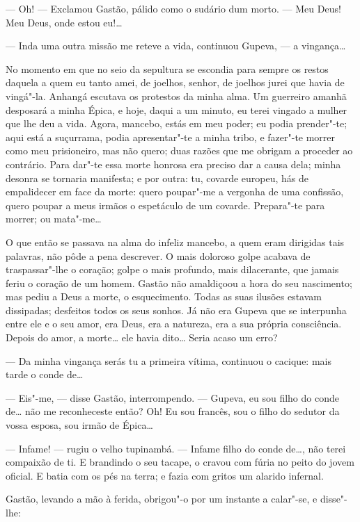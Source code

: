--- Oh! --- Exclamou Gastão, pálido como o sudário dum morto. --- Meu
Deus! Meu Deus, onde estou eu!\ldots{}

--- Inda uma outra missão me reteve a vida, continuou Gupeva, --- a
vingança\ldots{}

No momento em que no seio da sepultura se escondia para sempre os restos
daquela a quem eu tanto amei, de joelhos, senhor, de joelhos jurei que
havia de vingá"-la. Anhangá escutava os protestos da minha alma. Um
guerreiro amanhã desposará a minha Épica, e hoje, daqui a um minuto, eu
terei vingado a mulher que lhe deu a vida. Agora, mancebo, estás em meu
poder; eu podia prender"-te; aqui está a suçurrama, podia apresentar"-te a
minha tribo, e fazer"-te morrer como meu prisioneiro, mas não quero; duas
razões que me obrigam a proceder ao contrário. Para dar"-te essa morte
honrosa era preciso dar a causa dela; minha desonra se tornaria
manifesta; e por outra: tu, covarde europeu, hás de empalidecer em face
da morte: quero poupar"-me a vergonha de uma confissão, quero poupar a
meus irmãos o espetáculo de um covarde. Prepara"-te para morrer; ou
mata"-me\ldots{}

O que então se passava na alma do infeliz mancebo, a quem eram dirigidas
tais palavras, não pôde a pena descrever. O mais doloroso golpe acabava
de traspassar"-lhe o coração; golpe o mais profundo, mais dilacerante,
que jamais feriu o coração de um homem. Gastão não amaldiçoou a hora do
seu nascimento; mas pediu a Deus a morte, o esquecimento. Todas as suas
ilusões estavam dissipadas; desfeitos todos os seus sonhos. Já não era
Gupeva que se interpunha entre ele e o seu amor, era Deus, era a
natureza, era a sua própria consciência. Depois do amor, a morte\ldots{} ele
havia dito\ldots{} Seria acaso um erro?

--- Da minha vingança serás tu a primeira vítima, continuou o cacique:
mais tarde o conde de\ldots{}

--- Eis"-me, --- disse Gastão, interrompendo. --- Gupeva, eu sou filho do
conde de\ldots{} não me reconheceste então? Oh! Eu sou francês, sou o filho
do sedutor da vossa esposa, sou irmão de Épica\ldots{}

--- Infame! --- rugiu o velho tupinambá. --- Infame filho do conde de\ldots{},
não terei compaixão de ti. E brandindo o seu tacape, o cravou com fúria
no peito do jovem oficial. E batia com os pés na terra; e fazia com
gritos um alarido infernal.

Gastão, levando a mão à ferida, obrigou"-o por um instante a calar"-se, e
disse"-lhe:

